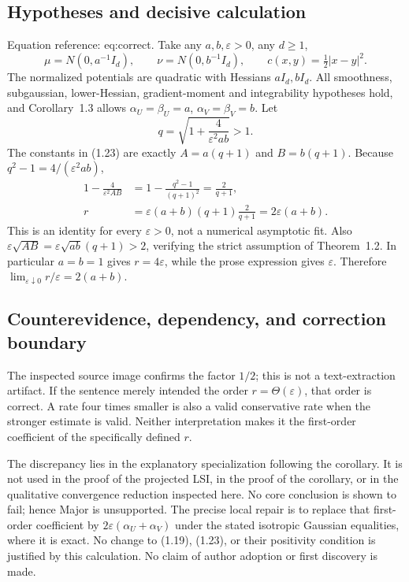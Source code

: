 \documentclass[10pt]{article}
\begin{document}
\subsection*{Hypotheses and decisive calculation}
Equation reference: eq:correct. Take any \(a,b,\varepsilon>0\), any \(d\ge1\), \[\mu=N(0,a^{-1}I_d),\qquad \nu=N(0,b^{-1}I_d),\qquad
c(x,y)=\tfrac12|x-y|^2.\] The normalized potentials are quadratic with Hessians \(aI_d,bI_d\). All smoothness, subgaussian, lower-Hessian, gradient-moment and integrability hypotheses hold, and Corollary 1.3 allows \(\alpha_U=\beta_U=a\), \(\alpha_V=\beta_V=b\). Let \[q=\sqrt{1+\frac4{\varepsilon^2ab}}>1.\] The constants in (1.23) are exactly \(A=a(q+1)\) and \(B=b(q+1)\). Because \(q^2-1=4/(\varepsilon^2ab)\), \[\begin{aligned}
1-\frac4{\varepsilon^2AB}
 &=1-\frac{q^2-1}{(q+1)^2}=\frac2{q+1},\\
r&=\varepsilon(a+b)(q+1)\frac2{q+1}
  =2\varepsilon(a+b). \end{aligned}\] This is an identity for every \(\varepsilon>0\), not a numerical asymptotic fit. Also \(\varepsilon\sqrt{AB}
=\varepsilon\sqrt{ab}(q+1)>2\), verifying the strict assumption of Theorem 1.2. In particular \(a=b=1\) gives \(r=4\varepsilon\), while the prose expression gives \(\varepsilon\). Therefore \(\lim_{\varepsilon\downarrow0}r/\varepsilon=2(a+b)\).\par
\subsection*{Counterevidence, dependency, and correction boundary}
The inspected source image confirms the factor \(1/2\); this is not a text-extraction artifact. If the sentence merely intended the order \(r=\Theta(\varepsilon)\), that order is correct. A rate four times smaller is also a valid conservative rate when the stronger estimate is valid. Neither interpretation makes it the first-order coefficient of the specifically defined \(r\).\par
The discrepancy lies in the explanatory specialization following the corollary. It is not used in the proof of the projected LSI, in the proof of the corollary, or in the qualitative convergence reduction inspected here. No core conclusion is shown to fail; hence Major is unsupported. The precise local repair is to replace that first-order coefficient by \(2\varepsilon(\alpha_U+\alpha_V)\) under the stated isotropic Gaussian equalities, where it is exact. No change to (1.19), (1.23), or their positivity condition is justified by this calculation. No claim of author adoption or first discovery is made.\par
\end{document}

